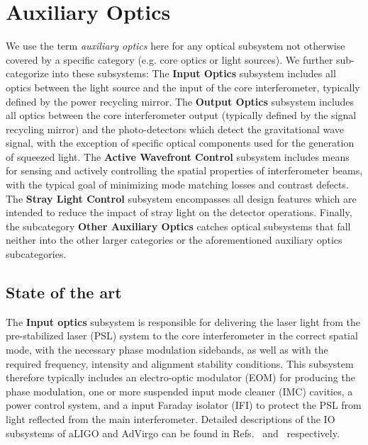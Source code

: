 \chapter{Auxiliary Optics}
\label{sec:Aux-optics}

We use the term \emph{auxiliary optics} here for any optical subsystem not otherwise covered by a specific category (e.g. core optics or light sources). We further sub-categorize into these subsystems:
The {\bf Input Optics} subsystem includes all optics between the light source and the input of the core interferometer, typically defined by the power recycling mirror. The {\bf Output Optics} subsystem includes all optics between the core interferometer output (typically defined by the signal recycling mirror) and the photo-detectors which detect the gravitational wave signal, with the exception of specific optical components used for the generation of squeezed light. The {\bf Active Wavefront Control} subsystem includes means for sensing and actively controlling the spatial properties of interferometer beams, with the typical goal of minimizing mode matching losses and contrast defects. The {\bf Stray Light Control} subsystem encompasses all design features which are intended to reduce the impact of stray light on the detector operations. Finally, the subcategory {\bf Other Auxiliary Optics} catches optical subsystems that fall neither into the other larger categories or the aforementioned auxiliary optics subcategories.

\section{State of the art}
The {\bf Input optics} subsystem is responsible for delivering the laser light from the pre-stabilized laser (PSL) system to the core interferometer in the correct spatial mode, with the necessary phase modulation sidebands, as well as with the required frequency, intensity and alignment stability conditions. This subsystem therefore typically includes an electro-optic modulator (EOM) for producing the phase modulation, one or more suspended input mode cleaner (IMC) cavities, a power control system, and a input Faraday isolator (IFI) to protect the PSL from light reflected from the main interferometer. Detailed descriptions of the IO subsystems of aLIGO and AdVirgo can be found in Refs.~\cite{aLIGO_IO} and~\cite{IOchapter} respectively. 

